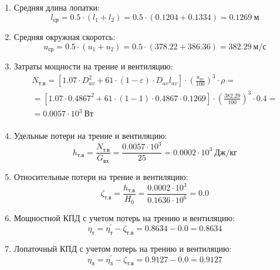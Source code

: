 \documentclass[a4paper,10pt]{article}
\begin{document}
\begin{enumerate}
        \item Средняя длина лопатки:
        \[
            l_{ср} = 0.5 \cdot (l_1 + l_2) =
                0.5 \cdot (0.1204 + 0.1334) =
            0.1269\ м
        \]

        \item Средняя окружная скоротсь:
        \[
            u_{ср} = 0.5 \cdot (u_1 + u_2) =
                0.5 \cdot (378.22 + 386.36) =
            382.29\ м/с
        \]

        \item Затраты мощности на трение и вентиляцию:
        \begin{gather*}
            N_{т.в} = \left[
                    1.07 \cdot D_{av}^2 + 61 \cdot (1 - \varepsilon) \cdot D_{av} l_{av}
            \right] \cdot
            \left(
                \frac{ u_{av} }{ 100 }
            \right) ^ 3 \cdot
            \rho =\\
            = \left[
                1.07 \cdot 0.4867^2 +
                61 \cdot (1 - 1) \cdot
                0.4867 \cdot 0.1269
            \right] \cdot
            \left(
                \frac{ 382.29 }{ 100 }
            \right) ^ 3 \cdot
            0.4=\\
            = 0.0057 \cdot 10^3 \ Вт \\
        \end{gather*}

        \item Удельные потери на трение и вентиляцию:
        \[
            h_{т.в} = \frac{ N_{т.в} }{ G_{вх} } =
                \frac{
                    0.0057 \cdot 10^3
                }{
                    25
                }
            = 0.0002 \cdot 10^3 \ Дж/кг
        \]

        \item Относительные потери на трение и вентиляцию:
        \[
            \zeta_{т.в} = \frac{ h_{т.в} }{ H_0 } =
                \frac{ 0.0002 \cdot 10^3 }{ 0.1636 \cdot 10^6 } =
            0.0
        \]

        \item Мощностной КПД с учетом потерь на трению и вентиляцию:
        \[
            \eta_т = \eta_т^\prime - \zeta_{т.в} =
                0.8634 - 0.0 =
            0.8634
        \]

        \item Лопаточный КПД с учетом потерь на трению и вентиляцию:
        \[
            \eta_л = \eta_л^\prime - \zeta_{т.в} =
                0.9127 - 0.0 =
            0.9127
        \]


\end{enumerate}
\end{document}

